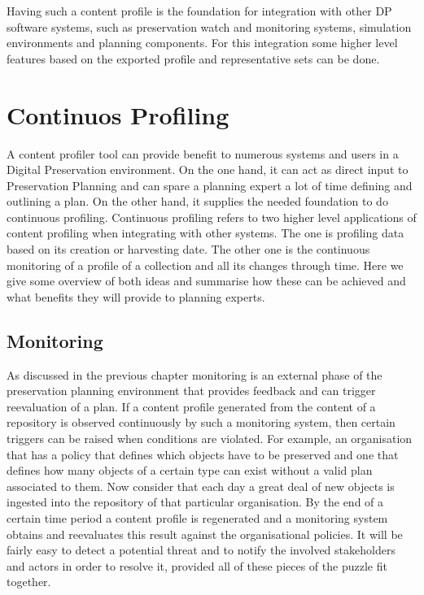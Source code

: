 Having such a content profile is the foundation for integration with other DP software systems, such as preservation watch and monitoring systems, simulation environments and planning components. For this integration some higher level features based on the exported profile and representative sets can be done.


\section{Continuos Profiling}
A content profiler tool can provide benefit to numerous systems and users in a Digital Preservation environment. On the one hand, it can act as direct input to Preservation Planning and can spare a planning expert a lot of time defining and outlining a plan. On the other hand, it supplies the needed foundation to do continuous profiling. Continuous profiling refers to two higher level applications of content profiling when integrating with other systems. The one is profiling data based on its creation or harvesting date. The other one is the continuous monitoring of a profile of a collection and all its changes through time. Here we give some overview of both ideas and summarise how these can be achieved and what benefits they will provide to planning experts.

\subsection{Monitoring}
As discussed in the previous chapter monitoring is an external phase of the preservation planning environment that provides feedback and can trigger reevaluation of a plan. If a content profile generated from the content of a repository is observed continuously by such a monitoring system, then certain triggers can be raised when conditions are violated.
For example, an organisation that has a policy that defines which objects have to be preserved and one that defines how many objects of a certain type can exist without a valid plan associated to them. Now consider that each day a great deal of new objects is ingested into the repository of that particular organisation. By the end of a certain time period a content profile is regenerated and a monitoring system obtains and reevaluates this result against the organisational policies. It will be fairly easy to detect a potential threat and to notify the involved stakeholders and actors in order to resolve it, provided all of these pieces of the puzzle fit together.

